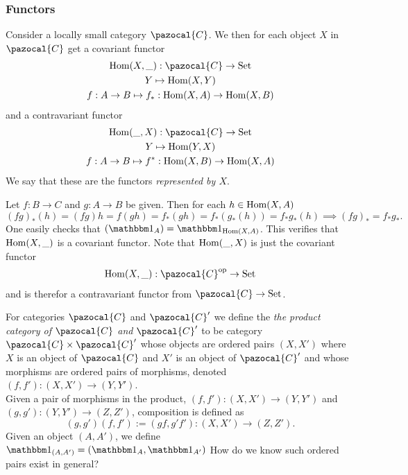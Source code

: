 \subsubsection{Functors}
\begin{definition}
    Consider a locally small category $\pazocal{C}$. We then for each object $X$ in $\pazocal{C}$ get a covariant functor 
    \begin{gather*}
        \Hom(X,\_) : \pazocal{C}\rightarrow \mathrm{Set}\\
        Y\mapsto \Hom(X,Y)\\
        f : A\rightarrow B \mapsto f_\ast: \Hom(X,A)\rightarrow \Hom(X,B) 
    \end{gather*}
    and a contravariant functor
    \begin{gather*}
        \Hom(\_,X) : \pazocal{C} \rightarrow \mathrm{Set}\\
        Y \mapsto \Hom(Y,X)\\
        f : A\rightarrow B \mapsto f^\ast: \Hom(X,B)\rightarrow \Hom(X,A) 
    \end{gather*}
    We say that these are the functors \emph{represented by $X$}.
\end{definition}
\begin{remark}
    Let $f: B\rightarrow C$ and $g:A\rightarrow B$ be given. Then for each $h\in \mathrm{Hom}(X,A)$
    $$
        (fg)_\ast(h)= (fg)h= f(gh)= f_\ast(gh)=f_\ast(g_\ast(h))=f_\ast g_\ast(h) \implies (fg)_\ast=f_\ast g_\ast.
    $$ 
    One easily checks that $(\fone_A) = \fone_{\Hom(X,A)}$. This verifies that $\mathrm{Hom}(X,\_)$ is a covariant functor. Note that $\mathrm{Hom}(\_,X)$ is just the covariant functor 
    \begin{gather*}
        \Hom(X,\_) : \pazocal{C}\op \rightarrow \mathrm{Set}
    \end{gather*}
    and is therefor a contravariant functor from $\pazocal{C}\rightarrow \mathrm{Set}$. 
\end{remark}
\begin{definition}
    For categories $\pazocal{C}$ and $\pazocal{C}'$ we define the \emph{the product category of $\pazocal{C}$ and $\pazocal{C}'$} to be category $\pazocal{C}\times \pazocal{C}'$ whose objects are ordered pairs $(X,X')$ where $X$ is an object of $\pazocal{C}$ and $X'$ is an object of $\pazocal{C}'$ and whose morphisms are ordered pairs of morphisms, denoted $(f,f'):(X,X')\rightarrow (Y,Y')$.\\
    Given a pair of morphisms in the product, $(f,f'):(X,X')\rightarrow (Y,Y')$ and $(g,g'): (Y,Y')\rightarrow (Z,Z')$, composition is defined as 
    $$
        (g,g')(f,f') := (gf,g'f') : (X,X')\rightarrow (Z,Z').
    $$
    Given an object $(A,A')$, we define $\fone_{(A,A')} = (\fone_A, \fone_{A'})$    
    {\Large How do we know such ordered pairs exist in general?}
\end{definition}
